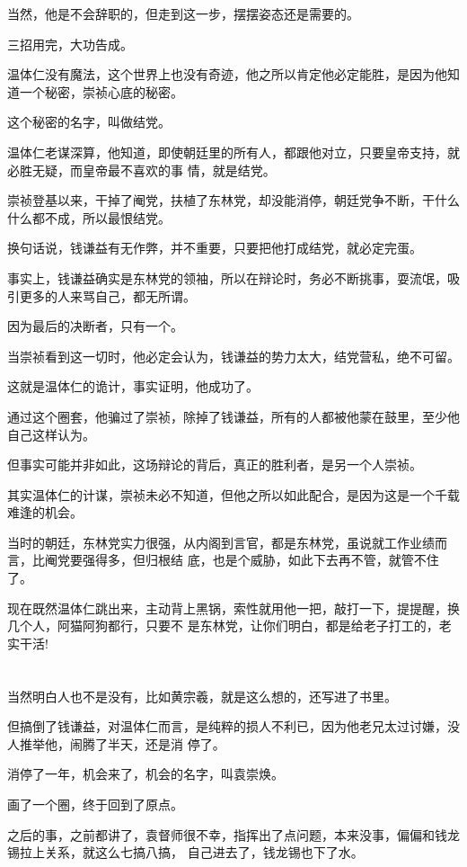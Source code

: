 \documentclass[11pt,a4paper,onecolumn]{article}
\begin{document}
当然，他是不会辞职的，但走到这一步，摆摆姿态还是需要的。

三招用完，大功告成。

温体仁没有魔法，这个世界上也没有奇迹，他之所以肯定他必定能胜，是因为他知道一个秘密，崇祯心底的秘密。

这个秘密的名字，叫做结党。

温体仁老谋深算，他知道，即使朝廷里的所有人，都跟他对立，只要皇帝支持，就必胜无疑，而皇帝最不喜欢的事
情，就是结党。

崇祯登基以来，干掉了阉党，扶植了东林党，却没能消停，朝廷党争不断，干什么什么都不成，所以最恨结党。

换句话说，钱谦益有无作弊，并不重要，只要把他打成结党，就必定完蛋。

事实上，钱谦益确实是东林党的领袖，所以在辩论时，务必不断挑事，耍流氓，吸引更多的人来骂自己，都无所谓。

因为最后的决断者，只有一个。

当崇祯看到这一切时，他必定会认为，钱谦益的势力太大，结党营私，绝不可留。

这就是温体仁的诡计，事实证明，他成功了。

通过这个圈套，他骗过了崇祯，除掉了钱谦益，所有的人都被他蒙在鼓里，至少他自己这样认为。

但事实可能并非如此，这场辩论的背后，真正的胜利者，是另一个人\myrule 崇祯。

其实温体仁的计谋，崇祯未必不知道，但他之所以如此配合，是因为这是一个千载难逢的机会。

当时的朝廷，东林党实力很强，从内阁到言官，都是东林党，虽说就工作业绩而言，比阉党要强得多，但归根结
底，也是个威胁，如此下去再不管，就管不住了。

现在既然温体仁跳出来，主动背上黑锅，索性就用他一把，敲打一下，提提醒，换几个人，阿猫阿狗都行，只要不
是东林党，让你们明白，都是给老子打工的，老实干活!

\section[\thesection]{}

当然明白人也不是没有，比如黄宗羲，就是这么想的，还写进了书里。

但搞倒了钱谦益，对温体仁而言，是纯粹的损人不利已，因为他老兄太过讨嫌，没人推举他，闹腾了半天，还是消
停了。

消停了一年，机会来了，机会的名字，叫袁崇焕。

画了一个圈，终于回到了原点。

之后的事，之前都讲了，袁督师很不幸，指挥出了点问题，本来没事，偏偏和钱龙锡拉上关系，就这么七搞八搞，
自己进去了，钱龙锡也下了水。
\end{document}
